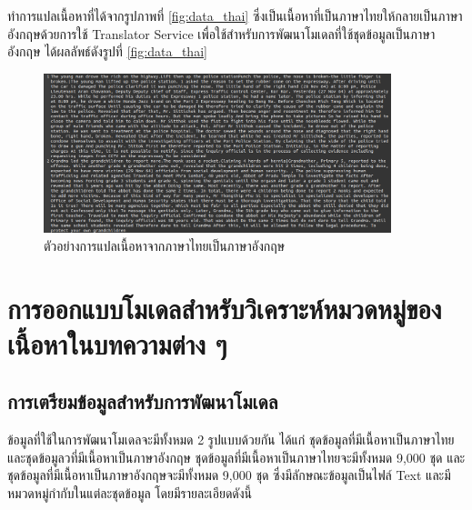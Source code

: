 \documentclass[12pt,oneside,openright,a4paper]{cpe-thai-project}
\begin{document}
    \hspace{1cm}ทำการแปลเนื้อหาที่ได้จากรูปภาพที่ \ref{fig:data_thai} ซึ่งเป็นเนื้อหาที่เป็นภาษาไทยให้กลายเป็นภาษาอังกฤษด้วยการใช้ Translator Service
    เพื่อใช้สำหรับการพัฒนาโมเดลที่ใช้ชุดข้อมูลเป็นภาษาอังกฤษ ได้ผลลัพธ์ดังรูปที่ \ref{fig:data_thai}
    \begin{figure}[!ht]\centering
      \includegraphics[width=0.9\textwidth]{./img/data_col_eng.png}
      \caption{ตัวอย่างการแปลเนื้อหาจากภาษาไทยเป็นภาษาอังกฤษ}\label{fig:data_eng}
    \end{figure}
    \newpage

  \section{การออกแบบโมเดลสำหรับวิเคราะห์หมวดหมู่ของเนื้อหาในบทความต่าง ๆ}
    \subsection{การเตรียมข้อมูลสำหรับการพัฒนาโมเดล}
      \hspace{1cm}ข้อมูลที่ใช้ในการพัฒนาโมเดลจะมีทั้งหมด 2 รูปแบบด้วยกัน ได้แก่ ชุดข้อมูลที่มีเนื้อหาเป็นภาษาไทยและชุดข้อมูลวที่มีเนื้อหาเป็นภาษาอังกฤษ
      ชุดข้อมูลที่มีเนื้อหาเป็นภาษาไทยจะมีทั้งหมด 9,000 ชุด และชุดข้อมูลที่มีเนื้อหาเป็นภาษาอังกฤษจะมีทั้งหมด 9,000 ชุด ซึ่งมีลักษณะข้อมูลเป็นไฟล์ Text
      และมีหมวดหมู่กำกับในแต่ละชุดข้อมูล โดยมีรายละเอียดดังนี้
\end{document}
